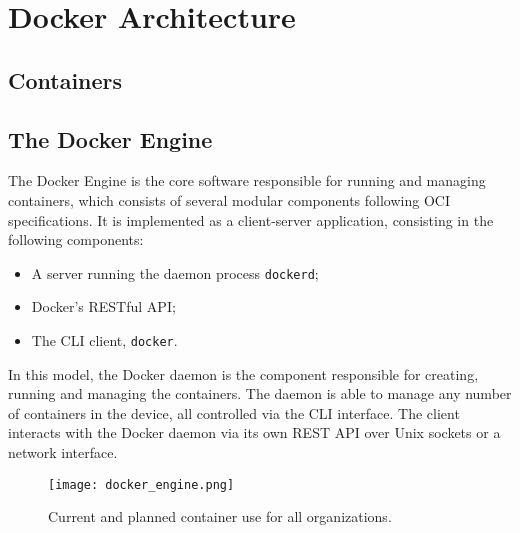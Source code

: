 \section{Docker Architecture}
\label{sec::arch}



\subsection{Containers}
\label{sec::arch:containers}


\subsection{The Docker Engine}
\label{sec::arch:engine}
The Docker Engine is the core software responsible for running and managing containers, which consists of several modular components following \ac{OCI} specifications\cite{Docker-engine}. It is implemented as a client-server application, consisting in the following components:

\begin{itemize}
    \item A server running the daemon process \texttt{dockerd};
    \item Docker's \acs{REST}ful \ac{API};
    \item The \ac{CLI} client, \texttt{docker}.
\end{itemize}

In this model, the Docker daemon is the component responsible for creating, running and managing the containers. The daemon is able to manage any number of containers in the device, all controlled via the \ac{CLI} interface. The client interacts with the Docker daemon via its own \ac{REST} \ac{API} over Unix sockets or a network interface\cite{Poulton2020-ju}.

\begin{figure}[!htb]
    \centering
    \texttt{[image: docker\_engine.png]}
    \caption{Current and planned container use for all organizations.}
    \label{fig:docker-engine-server}
\end{figure}

